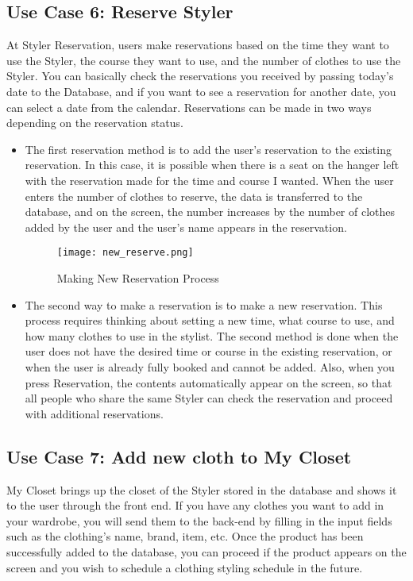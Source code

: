 \documentclass[conference]{IEEEtran}
\begin{document}
\subsection{Use Case 6: Reserve Styler}
At Styler Reservation, users make reservations based on the time they want to use the Styler, the course they want to use, and the number of clothes to use the Styler. You can basically check the reservations you received by passing today's date to the Database, and if you want to see a reservation for another date, you can select a date from the calendar. Reservations can be made in two ways depending on the reservation status.\\
\begin{itemize}
    \begin{figure}[htbp]
    \centerline{\texttt{[image: add\_reserve.png]}}
    \label{fig}
    \caption{Adding Reservation Process}
    \end{figure}
    \item The first reservation method is to add the user's reservation to the existing reservation. In this case, it is possible when there is a seat on the hanger left with the reservation made for the time and course I wanted. When the user enters the number of clothes to reserve, the data is transferred to the database, and on the screen, the number increases by the number of clothes added by the user and the user's name appears in the reservation.\\
    
    \begin{figure}[htbp]
    \centerline{\texttt{[image: new\_reserve.png]}}
    \label{fig}
    \caption{Making New Reservation Process}
    \end{figure}
    \item The second way to make a reservation is to make a new reservation. This process requires thinking about setting a new time, what course to use, and how many clothes to use in the stylist. The second method is done when the user does not have the desired time or course in the existing reservation, or when the user is already fully booked and cannot be added. Also, when you press Reservation, the contents automatically appear on the screen, so that all people who share the same Styler can check the reservation and proceed with additional reservations.\\
\end{itemize}

\subsection{Use Case 7: Add new cloth to My Closet}
My Closet brings up the closet of the Styler stored in the database and shows it to the user through the front end. If you have any clothes you want to add in your wardrobe, you will send them to the back-end by filling in the input fields such as the clothing's name, brand, item, etc. Once the product has been successfully added to the database, you can proceed if the product appears on the screen and you wish to schedule a clothing styling schedule in the future.\\
\end{document}
